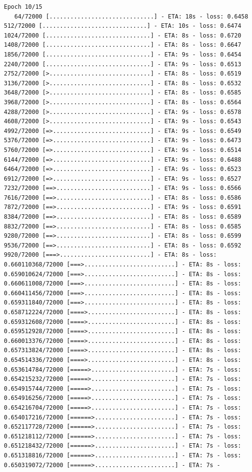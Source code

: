 \documentclass[12pt,fleqn]{article}\usepackage{../../common}
\begin{document}
\begin{verbatim}
Epoch 10/15
   64/72000 [..............................] - ETA: 18s - loss: 0.6458  512/72000 [..............................] - ETA: 10s - loss: 0.6474 1024/72000 [..............................] - ETA: 8s - loss: 0.6720  1408/72000 [..............................] - ETA: 8s - loss: 0.6647 1856/72000 [..............................] - ETA: 9s - loss: 0.6454 2240/72000 [..............................] - ETA: 9s - loss: 0.6513 2752/72000 [>.............................] - ETA: 8s - loss: 0.6519 3136/72000 [>.............................] - ETA: 8s - loss: 0.6532 3648/72000 [>.............................] - ETA: 8s - loss: 0.6585 3968/72000 [>.............................] - ETA: 8s - loss: 0.6564 4288/72000 [>.............................] - ETA: 9s - loss: 0.6578 4608/72000 [>.............................] - ETA: 9s - loss: 0.6543 4992/72000 [=>............................] - ETA: 9s - loss: 0.6549 5376/72000 [=>............................] - ETA: 9s - loss: 0.6473 5760/72000 [=>............................] - ETA: 9s - loss: 0.6514 6144/72000 [=>............................] - ETA: 9s - loss: 0.6488 6464/72000 [=>............................] - ETA: 9s - loss: 0.6523 6912/72000 [=>............................] - ETA: 9s - loss: 0.6527 7232/72000 [==>...........................] - ETA: 9s - loss: 0.6566 7616/72000 [==>...........................] - ETA: 8s - loss: 0.6586 7872/72000 [==>...........................] - ETA: 9s - loss: 0.6591 8384/72000 [==>...........................] - ETA: 8s - loss: 0.6589 8832/72000 [==>...........................] - ETA: 8s - loss: 0.6585 9280/72000 [==>...........................] - ETA: 8s - loss: 0.6599 9536/72000 [==>...........................] - ETA: 8s - loss: 0.6592 9920/72000 [===>..........................] - ETA: 8s - loss: 0.660110368/72000 [===>..........................] - ETA: 8s - loss: 0.659010624/72000 [===>..........................] - ETA: 8s - loss: 0.660611008/72000 [===>..........................] - ETA: 8s - loss: 0.660411456/72000 [===>..........................] - ETA: 8s - loss: 0.659311840/72000 [===>..........................] - ETA: 8s - loss: 0.658712224/72000 [====>.........................] - ETA: 8s - loss: 0.659312608/72000 [====>.........................] - ETA: 8s - loss: 0.659512928/72000 [====>.........................] - ETA: 8s - loss: 0.660013376/72000 [====>.........................] - ETA: 8s - loss: 0.657313824/72000 [====>.........................] - ETA: 8s - loss: 0.654514336/72000 [====>.........................] - ETA: 8s - loss: 0.653614784/72000 [=====>........................] - ETA: 7s - loss: 0.654215232/72000 [=====>........................] - ETA: 7s - loss: 0.654915744/72000 [=====>........................] - ETA: 7s - loss: 0.654916256/72000 [=====>........................] - ETA: 7s - loss: 0.654216704/72000 [=====>........................] - ETA: 7s - loss: 0.654017216/72000 [======>.......................] - ETA: 7s - loss: 0.652117728/72000 [======>.......................] - ETA: 7s - loss: 0.651218112/72000 [======>.......................] - ETA: 7s - loss: 0.651218432/72000 [======>.......................] - ETA: 7s - loss: 0.651318816/72000 [======>.......................] - ETA: 7s - loss: 0.650319072/72000 [======>.......................] - ETA: 7s - 
\end{verbatim}
\end{document}
